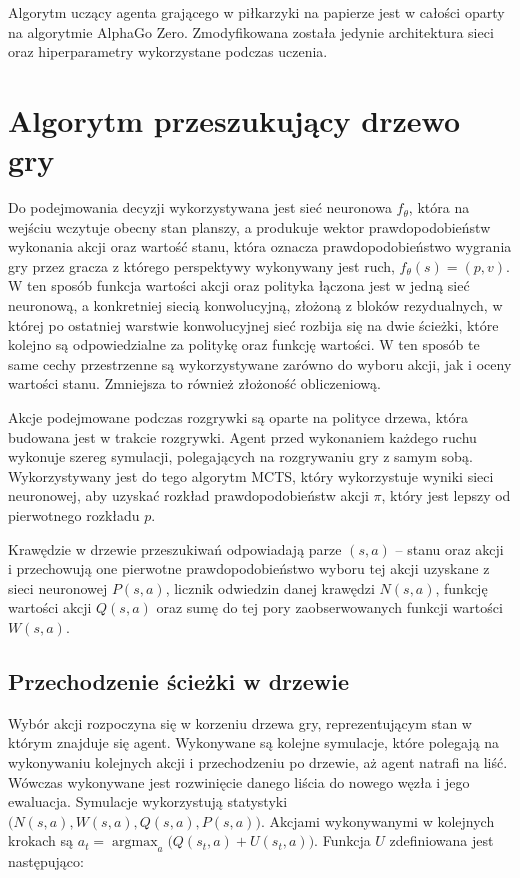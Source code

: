\documentclass[licencjacka]{pracamgr}
\begin{document}
Algorytm uczący agenta grającego w piłkarzyki na papierze jest w całości oparty na algorytmie AlphaGo Zero. Zmodyfikowana została jedynie architektura sieci oraz hiperparametry wykorzystane podczas uczenia.

\section{Algorytm przeszukujący drzewo gry}

Do podejmowania decyzji wykorzystywana jest sieć neuronowa $f_\theta$, która na wejściu wczytuje obecny stan planszy, a produkuje wektor prawdopodobieństw wykonania akcji oraz wartość stanu, która oznacza prawdopodobieństwo wygrania gry przez gracza z którego perspektywy wykonywany jest ruch, $f_\theta(s) = (p, v)$. W ten sposób funkcja wartości akcji oraz polityka łączona jest w jedną sieć neuronową, a konkretniej siecią konwolucyjną, złożoną z bloków rezydualnych, w której po ostatniej warstwie konwolucyjnej sieć rozbija się na dwie ścieżki, które kolejno są odpowiedzialne za politykę oraz funkcję wartości. W ten sposób te same cechy przestrzenne są wykorzystywane zarówno do wyboru akcji, jak i oceny wartości stanu. Zmniejsza to również złożoność obliczeniową.

Akcje podejmowane podczas rozgrywki są oparte na polityce drzewa, która budowana jest w trakcie rozgrywki. Agent przed wykonaniem każdego ruchu wykonuje szereg symulacji, polegających na rozgrywaniu gry z samym sobą. Wykorzystywany jest do tego algorytm MCTS, który wykorzystuje wyniki sieci neuronowej, aby uzyskać rozkład prawdopodobieństw akcji $\pi$, który jest lepszy od pierwotnego rozkładu $p$. 

Krawędzie w drzewie przeszukiwań odpowiadają parze $(s, a)$ -- stanu oraz akcji i przechowują one pierwotne prawdopodobieństwo wyboru tej akcji uzyskane z sieci neuronowej $P(s, a)$, licznik odwiedzin danej krawędzi $N(s,a)$, funkcję wartości akcji $Q(s,a)$ oraz sumę do tej pory zaobserwowanych funkcji wartości $W(s,a)$. 

\subsection{Przechodzenie ścieżki w drzewie}

Wybór akcji rozpoczyna się w korzeniu drzewa gry, reprezentującym stan w którym znajduje się agent. Wykonywane są kolejne symulacje, które polegają na wykonywaniu kolejnych akcji i przechodzeniu po drzewie, aż agent natrafi na liść. Wówczas wykonywane jest rozwinięcie danego liścia do nowego węzła i jego ewaluacja. Symulacje wykorzystują statystyki $\big(N(s,a), W(s,a), Q(s,a), P(s,a) \big)$. Akcjami wykonywanymi w kolejnych krokach są $a_t = \operatorname*{argmax}_a \big( Q(s_t, a) + U(s_t, a) \big)$. Funkcja $U$ zdefiniowana jest następująco:
\end{document}
